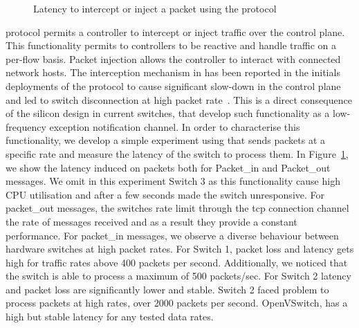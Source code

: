 \begin{figure}[ht]
  \begin{center}
  \end{center}
  \caption{Latency to intercept or inject a packet using the \of protocol}
  \label{fig:pkt_in_out_delay}
\end{figure}

\of protocol permits a controller to intercept or inject traffic over the
control plane. This functionality permits to \of
controllers to be reactive and handle traffic on a per-flow basis. Packet
injection allows the controller to interact with connected network hosts. The
interception mechanism in \of has been reported in the initials deployments of
the protocol to cause significant slow-down in the control plane and led to
switch disconnection at high packet rate~\cite{Kobayashi:vn}. This is a direct
consequence of the silicon design in current \of switches, that develop such
functionality as a low-frequency exception notification channel. In order to characterise
this functionality, we develop a simple experiment using \oflops that sends
packets at a specific rate and measure the latency of the switch to process
them. In Figure~\ref{fig:pkt_in_out_delay}, we show the latency induced on
packets both for Packet\_in and Packet\_out messages. We omit in this experiment
Switch 3 as this functionality cause high CPU utilisation and after a few
seconds made the switch unresponsive. For packet\_out
messages, the switches rate limit through the tcp connection channel the rate of
messages received and as a result they provide a constant performance. For
packet\_in messages, we observe a diverse behaviour between hardware switches at
high packet rates. For Switch 1, packet loss and latency gets high for traffic
rates above 400 packets per second. Additionally, we noticed that the switch is
able to process a maximum of 500 packets/sec. For Switch 2 latency and packet
loss are significantly lower and stable. Switch 2 faced problem to process
packets at high rates, over 2000 packets per second. OpenVSwitch,
has a high but stable latency for any tested data rates. 


